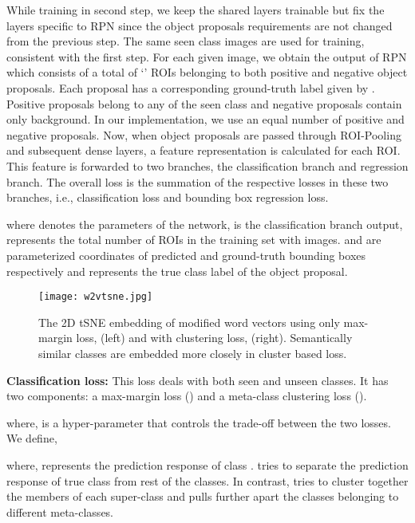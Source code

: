 \documentclass[runningheads]{llncs}
\begin{document}
While training in second step, we keep the shared layers trainable but fix the layers specific to RPN since the object proposals requirements are not changed from the previous step.  The same seen class images   are used for training, consistent with the first step. 
For each given image, we obtain the output of RPN which consists of a total of `' ROIs belonging to both positive and negative object proposals. 
Each proposal has a corresponding ground-truth label given by . Positive proposals belong to any of the seen class  and negative proposals contain only background. In our implementation, we use an equal number of positive and negative proposals. Now, when object proposals are passed through ROI-Pooling and subsequent dense layers, a feature representation  is calculated for each ROI. This feature is forwarded to two branches, the classification branch and regression branch. The overall loss is the summation of the respective losses in these two branches, i.e., classification loss and bounding box regression loss.
 
where  denotes the parameters of the network,  is the classification branch output,  represents the total number of ROIs in the training set with  images.  and  are parameterized coordinates of predicted and ground-truth bounding boxes respectively and  represents the true class label of the  object proposal.

\begin{SCfigure}[][t]
\texttt{[image: w2vtsne.jpg]}
\vspace{-0em}
   \caption{The 2D tSNE embedding of modified word vectors  using only max-margin loss,  (left) and with clustering loss,  (right). Semantically similar classes are embedded more closely in cluster based loss.}
\label{fig:w2vtsne}
\end{SCfigure}


\textbf{Classification loss:} This loss deals with both seen and unseen classes. It has two components: a max-margin loss () and a meta-class clustering loss ().

where,  is a hyper-parameter that controls the trade-off between the two losses. We define,

where,  represents the prediction response of class . 
 tries to separate the prediction response of true class from rest of the classes. In contrast,  tries to cluster together the members of each super-class and pulls further apart the classes belonging to different meta-classes. 
\end{document}

